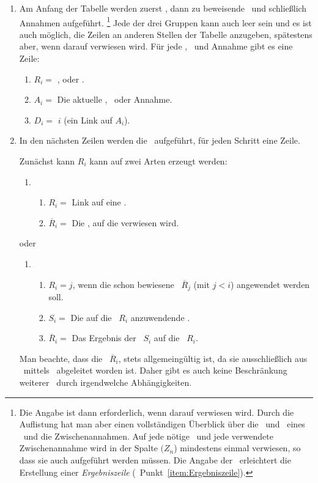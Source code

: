 \begin{enumerate}
	\item Am Anfang der Tabelle werden zuerst \Praemissen, dann zu beweisende \Konklusionen\ und schließlich Annahmen aufgeführt.%
	\footnote{%
		Die Angabe ist dann erforderlich, wenn darauf verwiesen wird.
		Durch die Auflistung hat man aber einen vollständigen Überblick über die \Praemissen\ und \Konklusionen\ eines \Beweises\ und die Zwischenannahmen.
		Auf jede nötige \Praemisse\ und jede verwendete Zwischenannahme wird in der Spalte $(Z_n$) mindestens einmal verwiesen, so dass sie auch aufgeführt werden müssen.
		Die Angabe der \Konklusionen\ erleichtert die Erstellung einer \emph{Ergebniszeile} (\seename\ Punkt~\ref{item:Ergebniszeile}).
	}
	Jede der drei Gruppen kann auch leer sein und es ist auch möglich, die Zeilen an anderen Stellen der Tabelle anzugeben, spätestens aber, wenn darauf verwiesen wird.
	Für jede \Praemisse, \Konklusion\ und Annahme gibt es eine Zeile:
	\begin{enumerate}
		\item $R_i =$ \strqt{\Praemisse}, \strqt{\Konklusion} oder .
		\item $A_i =$ Die aktuelle \Praemisse, \Konklusion\ oder Annahme.
		\item $D_i =$ $i$ \quad (ein Link auf $A_i$).
	\end{enumerate}
	\item In den nächsten Zeilen werden die \Beweisschritte\ aufgeführt, für jeden Schritt eine Zeile.

	Zunächst kann $R_i$ kann auf zwei Arten erzeugt werden:
	\begin{enumerate}
		\setcounter{enumii}{\value{Enumii}}%
		\item
		\begin{enumerate}
			\item $R_i =$ Link auf eine \allgemeingueltigeSchlussregel.
			\item $\overline{R}_i =$ Die \Schlussregel, auf die verwiesen wird.
		\end{enumerate}
		\setcounter{Enumii}{\value{enumii}}%
	\end{enumerate}
	oder
	\begin{enumerate}
		\item
		\begin{enumerate}
			\item $R_i = j$, wenn die schon bewiesene \Schlussregel\ $\overline{R}_j$ (mit $j < i$) angewendet werden soll.
			\item $S_i =$ Die auf die \Schlussregel\ $R_i$ anzuwendende \Ersetzung.
			\item $\overline{R}_i =$ Das Ergebnis der \Ersetzung\ $S_i$ auf die \Schlussregel\ $R_i$.
		\end{enumerate}
		\setcounter{Enumii}{\value{enumii}}%
	\end{enumerate}
	Man beachte, dass die \Schlussregel\ $\overline{R}_i$, stets allgemeingültig ist, da sie ausschließlich aus \allgemeingueltigenSchlussregeln\ mittels \Ersetzungen\ abgeleitet worden ist.
	Daher gibt es auch keine Beschränkung weiterer \Ersetzungen\ durch irgendwelche Abhängigkeiten.


\end{enumerate}
